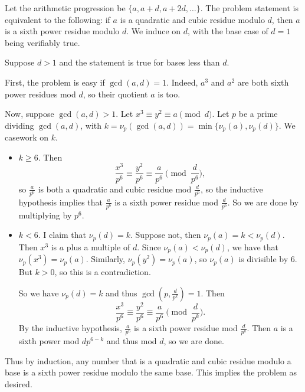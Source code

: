 Let the arithmetic progression be $\{a,a+d,a+2d,\dots\}$. The problem statement is equivalent to the following: if $a$ is a quadratic and cubic residue modulo $d$, then $a$ is a sixth power residue modulo $d$. We induce on $d$, with the base case of $d=1$ being verifiably true.

Suppose $d>1$ and the statement is true for bases less than $d$.

First, the problem is easy if $\gcd(a,d)=1$. Indeed, $a^3$ and $a^2$ are both sixth power residues mod $d$, so their quotient $a$ is too.

Now, suppose $\gcd(a,d)>1$. Let $x^3\equiv y^2\equiv a\pmod d$. Let $p$ be a prime dividing $\gcd(a,d)$, with $k=\nu_p(\gcd(a,d))=\min\{\nu_p(a),\nu_p(d)\}$. We casework on $k$.
\begin{itemize}
	
	\item $k\geq6$. Then
	\[
		\frac{x^3}{p^6}\equiv\frac{y^2}{p^6}\equiv\frac{a}{p^6}\pmod{\frac{d}{p^6}},
	\]
	so $\frac{a}{p^6}$ is both a quadratic and cubic residue mod $\frac{d}{p^6}$, so the inductive hypothesis implies that $\frac{a}{p^6}$ is a sixth power residue mod $\frac{d}{p^6}$. So we are done by multiplying by $p^6$.
	
	\item $k<6$. I claim that $\nu_p(d)=k$. Suppose not, then $\nu_p(a)=k<\nu_p(d)$. Then $x^3$ is $a$ plus a multiple of $d$. Since $\nu_p(a)<\nu_p(d)$, we have that $\nu_p(x^3)=\nu_p(a)$. Similarly, $\nu_p(y^2)=\nu_p(a)$, so $\nu_p(a)$ is divisible by $6$. But $k>0$, so this is a contradiction.
	
	So we have $\nu_p(d)=k$ and thus $\gcd(p,\frac{d}{p^k})=1$. Then
	\[
		\frac{x^3}{p^6}\equiv\frac{y^2}{p^6}\equiv\frac{a}{p^6}\pmod{\frac{d}{p^k}}.
	\]
	By the inductive hypothesis, $\frac{a}{p^6}$ is a sixth power residue mod $\frac{d}{p^k}$. Then $a$ is a sixth power mod $dp^{6-k}$ and thus mod $d$, so we are done.
\end{itemize}
Thus by induction, any number that is a quadratic and cubic residue modulo a base is a sixth power residue modulo the same base. This implies the problem as desired.
